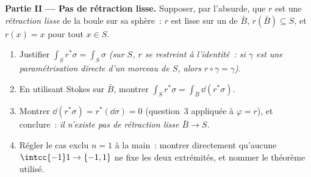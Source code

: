 \begin{problem}
\medskip
\noindent\textbf{Partie II --- Pas de rétraction lisse.}
Supposer, par l'absurde, que $r$ est une \emph{rétraction
lisse} de la boule sur sa sphère~: $r$ est lisse sur un
 de $\bar B$, $r(\bar B) \subseteq S$, et $r(x) =
x$ pour tout $x \in S$.
\begin{enumerate}[resume]
  \item Justifier $\int_Sr^*\sigma = \int_S\sigma$
        \emph{(sur $S$, $r$ se restreint à l'identité~: si
        $\gamma$ est une paramétrisation directe d'un
        morceau de $S$, alors $r\circ\gamma = \gamma$)}.
  \item En utilisant Stokes sur $\bar B$, montrer
        $\int_Sr^*\sigma = \int_{\bar B}\dd(r^*\sigma)$.
  \item Montrer $\dd(r^*\sigma) = r^*(\dd\sigma) = 0$
        (question~3 appliquée à $\varphi = r$), et
        conclure~: \emph{il n'existe pas de rétraction lisse
        $\bar B \to S$}.
  \item Régler le cas exclu $n = 1$ à la main~: montrer
        directement qu'aucune 
        $\intcc{-1}1 \to \{-1, 1\}$ ne fixe les deux
        extrémités, et nommer le théorème utilisé.
\end{enumerate}


\end{problem}
